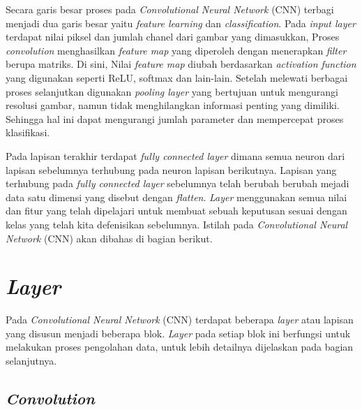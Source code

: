     Secara garis besar proses pada \textit{Convolutional Neural Network} (CNN) terbagi menjadi dua garis besar yaitu \textit{feature learning} dan \textit{classification}. Pada \textit{input layer} terdapat nilai piksel dan jumlah chanel dari gambar yang dimasukkan, Proses \textit{convolution} menghasilkan \textit{feature map} 
    yang diperoleh dengan menerapkan \textit{filter} berupa matriks.  Di sini, Nilai \textit{feature map} diubah berdasarkan \textit{activation function} yang digunakan seperti ReLU, softmax dan lain-lain. Setelah melewati berbagai proses selanjutkan digunakan \textit{pooling layer} yang bertujuan untuk mengurangi resolusi gambar, namun tidak menghilangkan informasi penting yang dimiliki. Sehingga hal ini dapat mengurangi jumlah parameter dan mempercepat proses klasifikasi. 

    Pada lapisan terakhir terdapat \textit{fully connected layer} dimana semua neuron dari lapisan sebelumnya terhubung 
    pada neuron lapisan berikutnya. Lapisan yang terhubung pada \textit{fully connected layer} sebelumnya telah berubah 
    berubah mejadi data satu dimensi yang disebut dengan \textit{flatten}. \textit{Layer}
    menggunakan semua nilai dan fitur yang telah dipelajari untuk membuat sebuah keputusan sesuai dengan kelas yang telah 
    kita defenisikan sebelumnya. Istilah pada \textit{Convolutional Neural Network} (CNN) akan dibahas di bagian berikut. 


\section{\textit{Layer}}

Pada \textit{Convolutional Neural Network} (CNN) terdapat beberapa \textit{layer} atau lapisan yang disusun 
menjadi beberapa blok. \textit{Layer} pada setiap blok ini berfungsi untuk melakukan proses pengolahan data, 
untuk lebih detailnya dijelaskan pada bagian selanjutnya.


\subsection{\textit{Convolution}}

